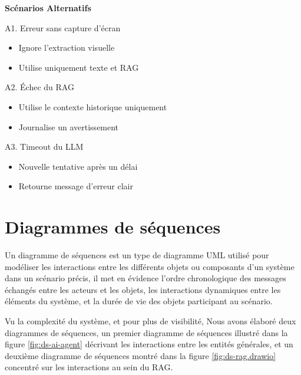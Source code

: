\documentclass[12pt,a4paper]{report}
\begin{document}
	\textbf{Scénarios Alternatifs}
	
	\begin{description}
		\item{A1. Erreur sans capture d'écran}
		\begin{itemize}
			\item Ignore l'extraction visuelle
			\item Utilise uniquement texte et RAG
		\end{itemize}
		
		\item{A2. Échec du RAG }
		
		\begin{itemize}
			\item Utilise le contexte historique uniquement
			\item Journalise un avertissement
		\end{itemize}
		
		\item{A3. Timeout du LLM} 
		
		\begin{itemize}
			\item Nouvelle tentative après un délai
			\item Retourne message d'erreur clair
		\end{itemize}
	\end{description}
	
	\section{Diagrammes de séquences}
	
	Un diagramme de séquences est un type de diagramme UML utilisé pour modéliser les interactions entre les différents objets ou composants d'un système dans un scénario précis, il met en évidence l'ordre chronologique des messages échangés entre les acteurs et les objets, les interactions dynamiques entre les éléments du système, et la durée de vie des objets participant au scénario.
	
	Vu la complexité du système, et pour plus de visibilité, Nous avons élaboré deux diagrammes de séquences, un premier diagramme de séquences illustré dans la figure \ref{fig:ds-ai-agent} décrivant les interactions entre les entités générales, et un deuxième diagramme de séquences montré dans la figure \ref{fig:ds-rag.drawio} concentré sur les interactions au sein du RAG.
	
\end{document}
